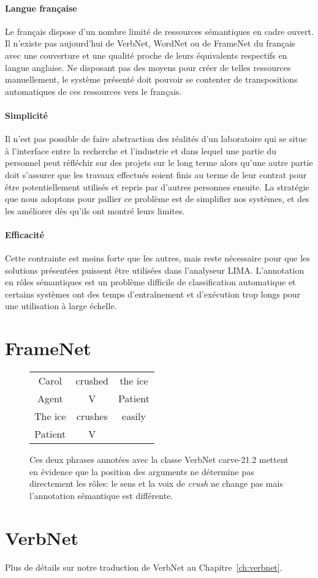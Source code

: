 \paragraph{Langue française} Le français dispose d'un nombre limité de
ressources sémantiques en cadre ouvert. Il n'existe pas aujourd'hui de VerbNet,
WordNet ou de FrameNet du français avec une couverture et une qualité proche de
leurs équivalents respectifs en langue anglaise. Ne disposant pas des moyens
pour créer de telles ressources manuellement, le système présenté doit pouvoir
se contenter de transpositions automatiques de ces ressources vers le français.

\paragraph{Simplicité} Il n'est pas possible de faire abstraction des réalités
d'un laboratoire qui se situe à l'interface entre la recherche et l'industrie
et dans lequel une partie du personnel peut réfléchir sur des projets sur le
long terme alors qu'une autre partie doit s'assurer que les travaux effectués
soient finis au terme de leur contrat pour être potentiellement utilisés et
repris par d'autres personnes ensuite. La stratégie que nous adoptons pour
pallier ce problème est de simplifier nos systèmes, et des les améliorer dès
qu'ils ont montré leurs limites.

\paragraph{Efficacité} Cette contrainte est moins forte que les autres, mais
reste nécessaire pour que les solutions présentées puissent être utilisées dans
l'analyseur LIMA. L'annotation en rôles sémantiques est un problème difficile
de classification automatique et certains systèmes ont des temps d'entraînement
et d'exécution trop longs pour une utilisation à large échelle.

\section{FrameNet}
\label{presentation_framenet}

\begin{figure}[ht]
    \centering
    \begin{tabular}{ccc}
        \toprule
        Carol & crushed   & the ice \\
        Agent & V         & Patient \\
        \midrule
        The ice & crushes & easily  \\
        Patient & V       &         \\
        \bottomrule
    \end{tabular}
    \caption{\label{fig:example_srl}Ces deux phrases annotées avec la classe VerbNet carve-21.2 mettent en évidence que la position des arguments ne détermine pas directement les rôles: le sens et la voix de \textit{crush} ne change pas mais l'annotation sémantique est différente.}
\end{figure}


\section{VerbNet}
\label{presentation_verbnet}

Plus de détails sur notre traduction de VerbNet au Chapitre~\ref{ch:verbnet}.
